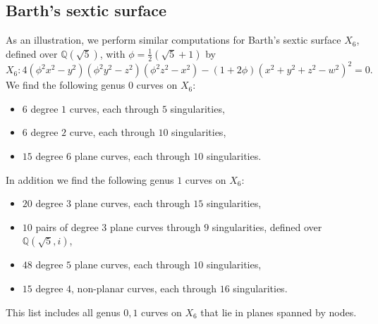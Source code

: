 \documentclass[12pt, reqno]{amsart}
\theoremstyle{definition}
\newcommand{\Q}{{\mathbb Q}}
\numberwithin{equation}{section}
\numberwithin{table}{section}
\begin{document}
\subsection{Barth's sextic surface}
\label{ss:BarthSextic}
As an illustration, we perform similar computations for Barth's sextic surface $X_6$, defined over $\Q(\sqrt{5})$, with $\phi=\frac{1}{2}(\sqrt{5}+1)$ by
\[
X_6\colon 4(\phi^2x^2-y^2)(\phi^2y^2-z^2)(\phi^2z^2-x^2)-(1+2\phi)(x^2+y^2+z^2-w^2)^2=0.
\]
We find the following genus $0$ curves on $X_6$:
\begin{itemize}
	\item $6$ degree $1$ curves, each through $5$ singularities,
	\item $6$ degree $2$ curve, each through $10$ singularities,
	\item $15$ degree $6$ plane curves, each through $10$ singularities.
\end{itemize}
In addition we find the following genus $1$ curves on $X_6$:
\begin{itemize}
	\item $20$ degree $3$ plane curves, each through $15$ singularities,
	\item $10$ pairs of degree $3$ plane curves through $9$ singularities, defined over $\Q(\sqrt{5},i)$,
	\item $48$ degree $5$ plane curves, each through $10$ singularities,
	\item $15$ degree $4$, non-planar curves, each through $16$ singularities.
\end{itemize}
This list includes all genus $0,1$ curves on $X_6$ that lie in planes spanned by nodes.  
\end{document}
